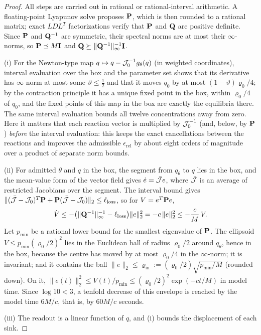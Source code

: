 \begin{proof}
All steps are carried out in rational or rational-interval arithmetic. A floating-point
Lyapunov solve proposes \(\mathbf P\), which is then rounded to a rational matrix; exact \(LDL^{T}\)
factorizations verify that \(\mathbf P\) and \(\mathbf Q\) are positive definite. Since \(\mathbf P\) and
\(\mathbf Q^{-1}\) are symmetric, their spectral norms are at most their \(\infty\)-norms, so
\(\mathbf P\preceq M\mathbf I\) and \(\mathbf Q\succeq\|\mathbf Q^{-1}\|_\infty^{-1}\mathbf I\).

(i) For the Newton-type map \(q\mapsto q-\mathcal J_0^{-1}g_\theta(q)\) (in weighted coordinates),
interval evaluation over the box and the parameter set shows that its derivative has
\(\infty\)-norm at most some \(\vartheta\le\tfrac12\) and that it moves \(q_0\) by at most
\((1-\vartheta)\varrho_0/4\); by the contraction principle it has a unique fixed point in the
box, within \(\varrho_0/4\) of \(q_0\), and the fixed points of this map in the box are exactly
the equilibria there. The same interval evaluation bounds all twelve concentrations away from zero. Here it
matters that each reaction vector is multiplied by \(\mathcal J_0^{-1}\) (and, below, by \(\mathbf P\))
\emph{before} the interval evaluation: this keeps the exact cancellations between the
reactions and improves the admissible \(\epsilon_{\mathrm{rel}}\) by about eight orders of
magnitude over a product of separate norm bounds.

(ii) For admitted \(\theta\) and \(q\) in the box, the segment from \(q_\theta\) to \(q\) lies in
the box, and the mean-value form of the vector field gives
\(\dot e=\bar{\mathcal J} e\), where \(\bar{\mathcal J}\) is an average of restricted Jacobians over the segment. The
interval bound gives
\(\|(\bar{\mathcal J}-\mathcal J_0)^{T}\mathbf P+\mathbf P(\bar{\mathcal J}-\mathcal J_0)\|_2\le\ell_{\mathrm{loss}}\), so for
\(V=e^{T}\mathbf P e\),
\[
 \dot V\le-\bigl(\|\mathbf Q^{-1}\|_\infty^{-1}-\ell_{\mathrm{loss}}\bigr)\|e\|_2^2=-c\,\|e\|_2^2
 \le-\frac cM\,V .
\]
Let \(p_{\min}\) be a rational lower bound for the smallest eigenvalue of \(\mathbf P\). The
ellipsoid \(V\le p_{\min}(\varrho_0/2)^2\) lies in the Euclidean ball of radius \(\varrho_0/2\)
around \(q_\theta\), hence in the box, because the centre has moved by at most
\(\varrho_0/4\) in the \(\infty\)-norm; it is invariant; and it contains the ball
\(\|e\|_2\le\varrho_{\mathrm{in}}:=(\varrho_0/2)\sqrt{p_{\min}/M}\) (rounded down). On it,
\(\|e(t)\|_2^2\le V(t)/p_{\min}\le(\varrho_0/2)^2\exp(-ct/M)\) in model time. Since
\(\log10<3\), a tenfold decrease of this envelope is reached by the model time \(6M/c\), that
is, by \(60M/c\) seconds.

(iii) The readout is a linear function of \(q\), and (i) bounds the displacement of each sink.
\end{proof}

